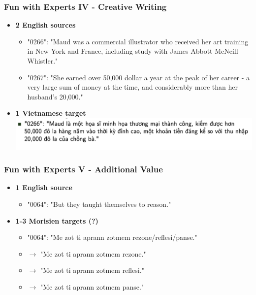 \documentclass[aspectratio=169]{beamer}
\begin{document}
\begin{frame}[fragile]
	\frametitle{Fun with Experts IV - Creative Writing}
    \centering
    \begin{itemize}
        \item \textbf{2 English sources}
        \begin{itemize}
            \item "0266": "Maud was a commercial illustrator who received her art training in New York and France, including study with James Abbott McNeill Whistler."
            \item "0267": "She earned over 50,000 dollar a year at the peak of her career - a very large sum of money at the time, and considerably more than her husband's 20,000."
        \end{itemize}
        \item \textbf{1 Vietnamese target}
        \includegraphics[width=\textwidth]{images/challenge-vie-3.png}
        
    \end{itemize}
\end{frame}

\begin{frame}[fragile]
	\frametitle{Fun with Experts V - Additional Value}
    \centering
    \begin{itemize}
        \item \textbf{1 English source}
        \begin{itemize}
            \item "0064": "But they taught themselves to reason."
        \end{itemize}
        \item \textbf{1-3 Morisien targets (?)}
        \begin{itemize}
            \item "0064": "Me zot ti aprann zotmem rezone/reflesi/panse."
            \item $\rightarrow$ "Me zot ti aprann zotmem rezone."
            \item $\rightarrow$ "Me zot ti aprann zotmem reflesi."
            \item $\rightarrow$ "Me zot ti aprann zotmem panse."
        \end{itemize}
    \end{itemize}
\end{frame}
\end{document}
